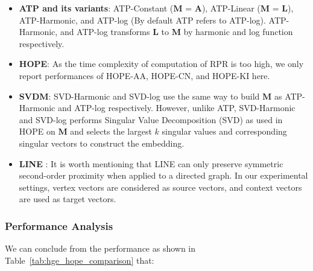 \documentclass[letterpaper]{article} \usepackage{aaai19}  \usepackage{times}  \usepackage{helvet}  \usepackage{courier}  \usepackage{url}  \usepackage{graphicx}  \usepackage{booktabs} \usepackage{xcolor}
\begin{document}
\begin{itemize}[leftmargin=0.4cm,noitemsep]
    \item \textbf{ATP and its variants}: ATP-Constant ($\boldsymbol{M}$ = $\boldsymbol{A}$), ATP-Linear ($\boldsymbol{M}$ = $\boldsymbol{L}$), ATP-Harmonic, and ATP-log (By default ATP refers to ATP-log). ATP-Harmonic, and ATP-log transforms $\boldsymbol{L}$ to $\boldsymbol{M}$ by harmonic and log function respectively.  
    \item \textbf{HOPE}\cite{Ou2016KDDAsymmetric}: 
As the time complexity of computation of RPR is too high, we only report performances of HOPE-AA, HOPE-CN, and HOPE-KI here. \item \textbf{SVDM}: SVD-Harmonic and SVD-log use the same way to build $\boldsymbol{M}$ as ATP-Harmonic and ATP-log respectively. However, unlike ATP, SVD-Harmonic and SVD-log performs Singular Value Decomposition (SVD) as used in HOPE on $\boldsymbol{M}$ and selects the largest $k$ singular values and corresponding singular vectors to construct the embedding. 
\item \textbf{LINE} \cite{Tang2015Line}: It is worth mentioning that LINE can only preserve symmetric second-order proximity when applied to a directed graph. In our experimental settings, vertex vectors are considered as source vectors, and context vectors are used as target vectors.  
\end{itemize}


\subsubsection{Performance Analysis} 

We can conclude from the performance as shown in Table~\ref{tab:hge_hope_comparison} that: 
\end{document}

